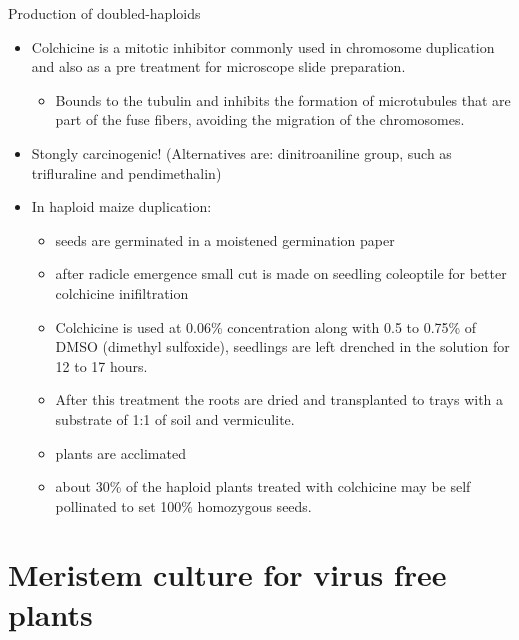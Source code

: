 \documentclass[
  ignorenonframetext,
  aspectratio=169]{beamer}
\providecommand{\tightlist}{%
  \setlength{\itemsep}{0pt}\setlength{\parskip}{0pt}}
\begin{document}
\begin{frame}{Production of doubled-haploids}
\protect\hypertarget{production-of-doubled-haploids}{}
\begin{itemize}
\tightlist
\item
  Colchicine is a mitotic inhibitor commonly used in chromosome
  duplication and also as a pre treatment for microscope slide
  preparation.

  \begin{itemize}
  \tightlist
  \item
    Bounds to the tubulin and inhibits the formation of microtubules
    that are part of the fuse fibers, avoiding the migration of the
    chromosomes.
  \end{itemize}
\item
  Stongly carcinogenic! (Alternatives are: dinitroaniline group, such as
  trifluraline and pendimethalin)
\end{itemize}
\end{frame}

\begin{frame}{}
\protect\hypertarget{section-7}{}
\begin{itemize}
\tightlist
\item
  In haploid maize duplication:

  \begin{itemize}
  \tightlist
  \item
    seeds are germinated in a moistened germination paper
  \item
    after radicle emergence small cut is made on seedling coleoptile for
    better colchicine inifiltration
  \item
    Colchicine is used at 0.06\% concentration along with 0.5 to 0.75\%
    of DMSO (dimethyl sulfoxide), seedlings are left drenched in the
    solution for 12 to 17 hours.
  \item
    After this treatment the roots are dried and transplanted to trays
    with a substrate of 1:1 of soil and vermiculite.
  \item
    plants are acclimated
  \item
    about 30\% of the haploid plants treated with colchicine may be self
    pollinated to set 100\% homozygous seeds.
  \end{itemize}
\end{itemize}
\end{frame}

\hypertarget{meristem-culture-for-virus-free-plants}{%
\section{Meristem culture for virus free
plants}\label{meristem-culture-for-virus-free-plants}}
\end{document}
